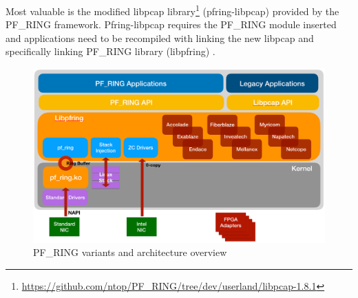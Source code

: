 \documentclass[12pt,a4paper,twoside]{report}
\begin{document}
			Most valuable is the modified libpcap library\footnote{\url{https://github.com/ntop/PF_RING/tree/dev/userland/libpcap-1.8.1}} (pfring-libpcap) provided by the PF\_RING framework. Pfring-libpcap requires the PF\_RING module inserted and applications need to be recompiled with linking the new libpcap and specifically linking PF\_RING library (libpfring) \cite{docs:pfring:libpcap}. 
			\begin{figure}[h]
				\centering
				\includegraphics[scale=0.35]{overall_pf_ring}
				\caption{PF\_RING variants and architecture overview}
				\label{figure:pfring:overview}
			\end{figure}
\end{document}
